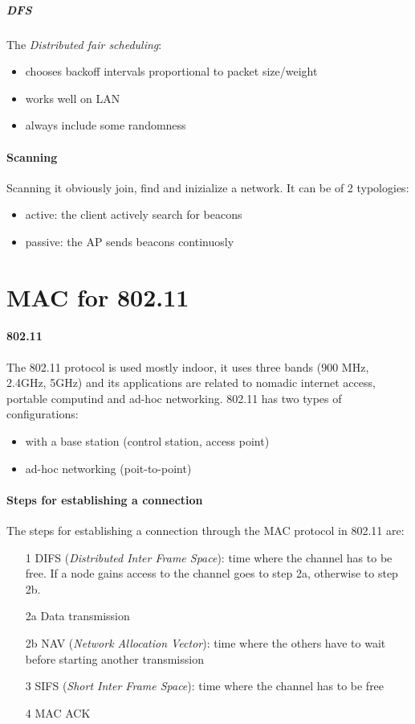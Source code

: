 \subparagraph*{DFS} The \textit{Distributed fair scheduling}:
\begin{itemize}
\item chooses backoff intervals proportional to packet size/weight
\item works well on LAN
\item always include some randomness
\end{itemize}

\paragraph*{Scanning} Scanning it obviously join, find and inizialize a network.
It can be of 2 typologies:
\begin{itemize}
\item active: the client actively search for beacons
\item passive: the AP sends beacons continuosly
\end{itemize}

\section{MAC for 802.11}
\paragraph*{802.11} The 802.11 protocol is used mostly indoor, it uses three
bands (900 MHz, 2.4GHz, 5GHz) and its applications are related to nomadic
internet access, portable computind and ad-hoc networking.
802.11 has two types of configurations:
\begin{itemize}
\item with a base station (control station, access point)
\item ad-hoc networking (poit-to-point)
\end{itemize}

\paragraph*{Steps for establishing a connection}
The steps for establishing a connection through the MAC protocol in 802.11 are:
\begin{enumerate}
\item[1] DIFS (\textit{Distributed Inter Frame Space}): time where the channel
  has to be free. If a node gains access to the channel goes to step 2a,
  otherwise to step 2b.
\item[2a] Data transmission
\item[2b] NAV (\textit{Network Allocation Vector}): time where the others have
  to wait before starting another transmission
\item[3] SIFS (\textit{Short Inter Frame Space}): time where the channel has to
  be free
\item[4] MAC ACK
\end{enumerate}

